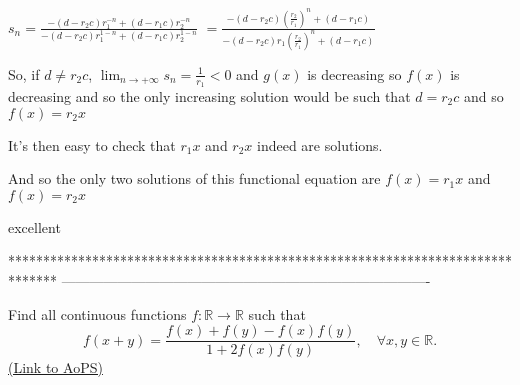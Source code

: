 \begin{solution}
$ s_n=\frac{-(d-r_2c)r_1^{-n}+(d-r_1c)r_2^{-n}}{-(d-r_2c)r_1^{1-n}+(d-r_1c)r_2^{1-n}}$ $ =\frac{-(d-r_2c)(\frac{r_2}{r_1})^n+(d-r_1c)}{-(d-r_2c)r_1(\frac{r_2}{r_1})^n+(d-r_1c)}$

So, if $ d\ne r_2c$, $ \lim_{n\to+\infty}s_n=\frac 1{r_1}<0$ and $ g(x)$ is decreasing so $ f(x)$ is decreasing and so the only increasing solution would be such that $ d=r_2c$ and so $ f(x)=r_2x$

It's then easy to check that $ r_1x$ and $ r_2x$ indeed are solutions.

And so the only two solutions of this functional equation are $ f(x)=r_1x$ and $ f(x)=r_2x$
\end{solution}



\begin{solution}
	excellent  
\end{solution}
*******************************************************************************
-------------------------------------------------------------------------------

\begin{problem}
	Find all continuous functions $ f : \mathbb{R} \to \mathbb{R}$ such that
\[f(x+y) = \frac{ f(x) + f(y) - f(x)f(y) }{1 + 2f(x)f(y) },\quad \forall x, y  \in \mathbb{R}.\]
	\flushright \href{https://artofproblemsolving.com/community/c6h309557}{(Link to AoPS)}
\end{problem}



